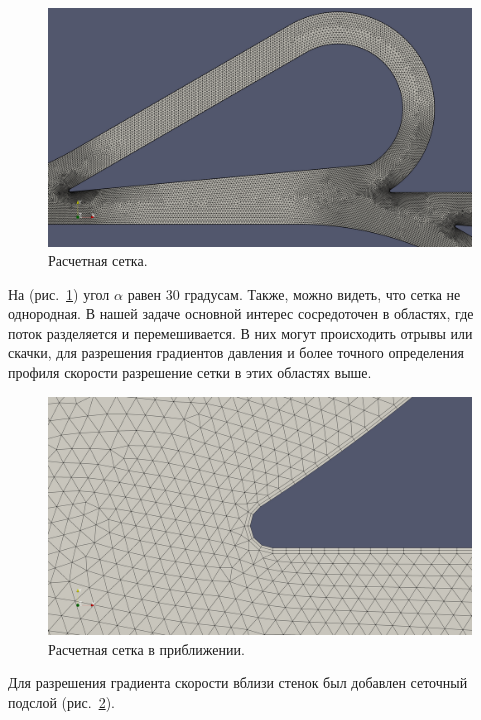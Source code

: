 \documentclass[14pt,a4paper]{article}
\begin{document}
        
        \begin{figure}[h!]
            \centering
            \includegraphics[width = 1\linewidth]{teslaMesh1}
            \caption{Расчетная сетка.}
            \label{fig:teslaMesh}
        \end{figure}
        
        На (рис.~\ref{fig:teslaMesh}) угол $\alpha$ равен 30 градусам. Также, можно видеть, что сетка не однородная. В нашей задаче основной интерес сосредоточен в областях, где поток разделяется и перемешивается. В них могут происходить отрывы или скачки, для разрешения градиентов давления и более точного определения профиля скорости разрешение сетки в этих областях выше.
        
        \begin{figure}[H]
            \centering
            \includegraphics[width = 1\linewidth]{teslaMesh2}
            \caption{Расчетная сетка в приближении.}
            \label{fig:teslaMesh2}
        \end{figure}   
             
        Для разрешения градиента скорости вблизи стенок был добавлен сеточный подслой (рис.~\ref{fig:teslaMesh2}).
        
\end{document}
